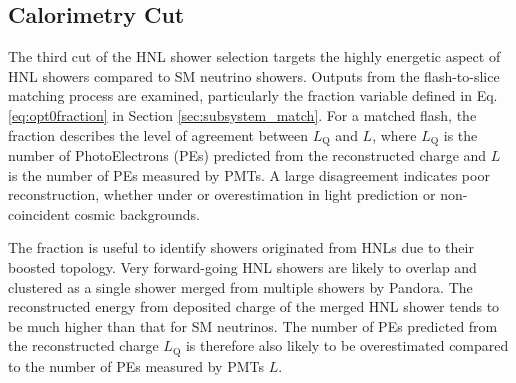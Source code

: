 \subsection{Calorimetry Cut}
\label{sec:calo_cut}

The third cut of the HNL shower selection targets the highly energetic aspect of HNL showers compared to SM neutrino showers.
Outputs from the flash-to-slice matching process are examined, particularly the fraction variable defined in Eq. \ref{eq:opt0fraction} in Section \ref{sec:subsystem_match}.
For a matched flash, the fraction describes the level of agreement between $L_{\mathrm{Q}}$ and $L$, where $L_\mathrm{Q}$ is the number of PhotoElectrons (PEs) predicted from the reconstructed charge and $L$ is the number of PEs measured by PMTs.
A large disagreement indicates poor reconstruction, whether under or overestimation in light prediction or non-coincident cosmic backgrounds.

The fraction is useful to identify showers originated from HNLs due to their boosted topology.
Very forward-going HNL showers are likely to overlap and clustered as a single shower merged from multiple showers by Pandora.   
The reconstructed energy from deposited charge of the merged HNL shower tends to be much higher than that for SM neutrinos.
The number of PEs predicted from the reconstructed charge $L_{\mathrm{Q}}$ is therefore also likely to be overestimated compared to the number of PEs measured by PMTs $L$.

